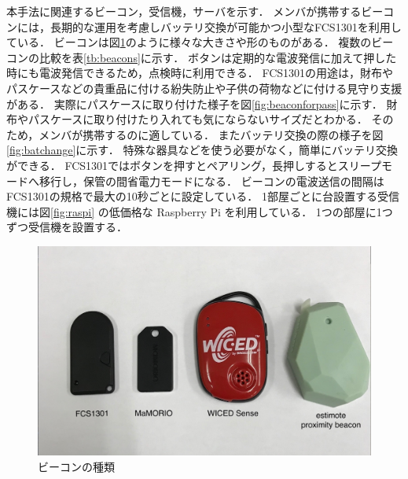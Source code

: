 本手法に関連するビーコン，受信機，サーバを示す．
メンバが携帯するビーコンには，長期的な運用を考慮しバッテリ交換が可能かつ小型なFCS1301\cite{fcs1301}を利用している．
ビーコンは図\ref{fig:beacons}のように様々な大きさや形のものがある．
複数のビーコンの比較を表\ref{tb:beacons}に示す．
ボタンは定期的な電波発信に加えて押した時にも電波発信できるため，点検時に利用できる．
FCS1301の用途は，財布やパスケースなどの貴重品に付ける紛失防止や子供の荷物などに付ける見守り支援がある．
実際にパスケースに取り付けた様子を図\ref{fig:beaconforpass}に示す．
財布やパスケースに取り付けたり入れても気にならないサイズだとわかる．
そのため，メンバが携帯するのに適している．
またバッテリ交換の際の様子を図\ref{fig:batchange}に示す．
特殊な器具などを使う必要がなく，簡単にバッテリ交換ができる．
FCS1301ではボタンを押すとペアリング，長押しするとスリープモードへ移行し，保管の間省電力モードになる．
ビーコンの電波送信の間隔はFCS1301の規格で最大の10秒ごとに設定している．
1部屋ごとに台設置する受信機には図\ref{fig:raspi} の低価格な Raspberry Pi\cite{raspi} を利用している．
1つの部屋に1つずつ受信機を設置する．

\begin{figure}[H]
  \begin{center}
    \includegraphics[width=150mm]{image/beaconType.jpg}
    \caption{ビーコンの種類}
    \label{fig:beacons}
  \end{center}
\end{figure}

